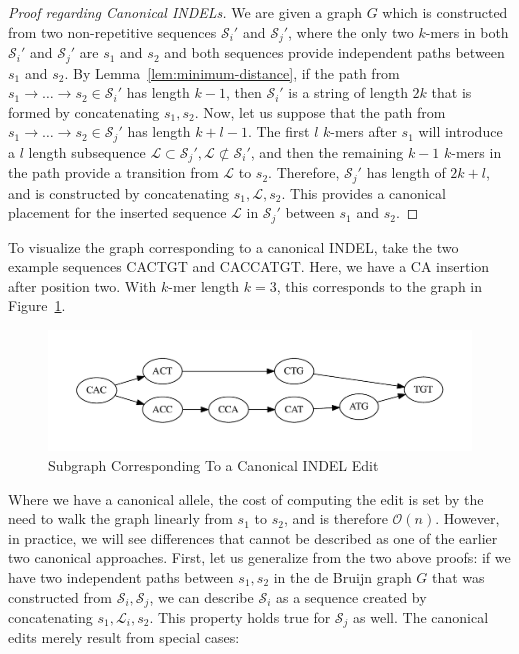 \documentclass[phd]{ucbthesis}
\begin{document}
\begin{proof}[Proof regarding Canonical INDELs]
\label{proof:canonical-indels}
We are given a graph $G$ which is constructed from two non-repetitive sequences $\mathcal{S}_i'$ and
$\mathcal{S}_j'$, where the only two $k$-mers in both $\mathcal{S}_i'$ and $\mathcal{S}_j'$ are $s_1$
and $s_2$ and both sequences provide independent paths between $s_1$ and $s_2$. By
Lemma~\ref{lem:minimum-distance}, if the path from $s_1 \rightarrow \dots \rightarrow s_2 \in
\mathcal{S}_i'$ has length $k - 1$, then $\mathcal{S}_i'$ is a string of length $2k$ that is formed by
concatenating $s_1, s_2$. Now, let us suppose that the path from $s_1 \rightarrow \dots \rightarrow s_2
\in \mathcal{S}_j'$ has length $k + l - 1$. The first $l$ $k$-mers after $s_1$ will introduce a $l$ length
subsequence $\mathcal{L} \subset \mathcal{S}_j', \mathcal{L} \not\subset \mathcal{S}_i'$, and then the
remaining $k - 1$ $k$-mers in the path provide a transition from $\mathcal{L}$ to $s_2$. Therefore,
$\mathcal{S}_j'$ has length of $2k + l$, and is constructed by concatenating $s_1, \mathcal{L}, s_2$.
This provides a canonical placement for the inserted sequence $\mathcal{L}$ in $\mathcal{S}_j'$ between
$s_1$ and $s_2$.
\end{proof}

To visualize the graph corresponding to a canonical INDEL, take the two example sequences
{CACTGT} and {CACCATGT}. Here, we have a {CA} insertion after position two. With
$k$-mer length $k = 3$, this corresponds to the graph in Figure~\ref{fig:indel}.

\begin{figure}[h]
\begin{center}
\includegraphics[width=0.95\linewidth, clip=true, trim=0 39 0 39]{graphs/indel.pdf}
\end{center}
\caption{Subgraph Corresponding To a Canonical INDEL Edit}
\label{fig:indel}
\end{figure}

Where we have a canonical allele, the cost of computing the edit is set by the need to walk the graph
linearly from $s_1$ to $s_2$, and is therefore $\mathcal{O}(n)$. However, in practice, we will see
differences that cannot be described as one of the earlier two canonical approaches. First, let us
generalize from the two above proofs: if we have two independent paths between $s_1, s_2$ in the
de Bruijn graph $G$ that was constructed from $\mathcal{S}_i, \mathcal{S}_j$, we can describe
$\mathcal{S}_i$ as a sequence created by concatenating $s_1, \mathcal{L}_i, s_2$. This
property holds true for $\mathcal{S}_j$ as well. The canonical edits merely result from special cases:
\end{document}
